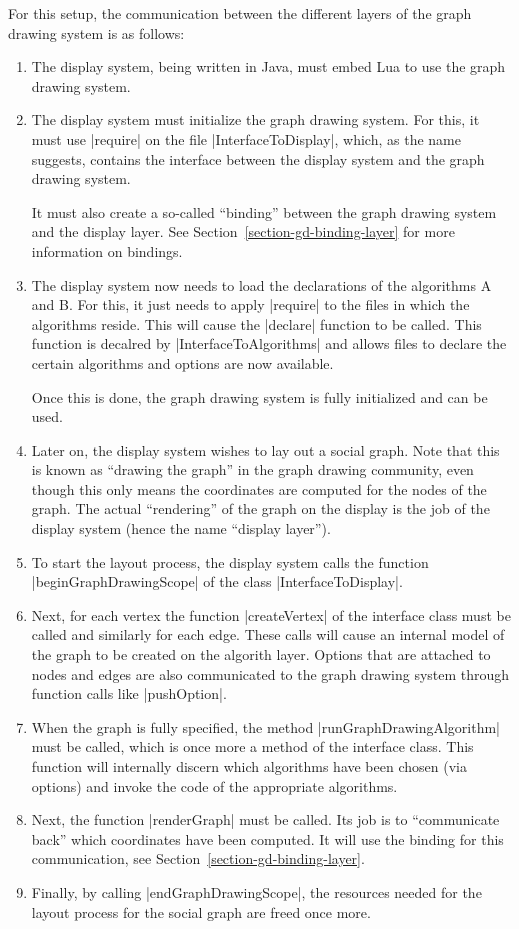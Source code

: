 For this setup, the communication between the different layers of the
graph drawing system is as follows:

\begin{enumerate}
\item The display system, being written in Java, must embed Lua to use the
  graph drawing system.
\item The display system must initialize the graph drawing system. For this,
  it must use |require| on the file |InterfaceToDisplay|, which, as
  the name suggests, contains the interface between the display
  system and the graph drawing system.
  
  It must also create a so-called ``binding'' between the
  graph drawing system and the display layer. See
  Section~\ref{section-gd-binding-layer} for more information on
  bindings.
\item The display system now needs to load the declarations of the
  algorithms A and B. For this, it just needs to apply |require| to
  the files in which the algorithms reside. This will cause the
  |declare| function to be called. This function is decalred by
  |InterfaceToAlgorithms| and allows files to declare the certain
  algorithms and options are now available.

  Once this is done, the graph drawing system is fully initialized and
  can be used.
\item Later on, the display system wishes to lay out a social graph. Note
  that this is known as ``drawing the graph'' in the graph drawing
  community, even though this only means the coordinates are computed
  for the nodes of the graph. The actual ``rendering'' of the graph on
  the display is the job of the display system (hence the name ``display
  layer'').
\item To start the layout process, the display system calls the function
  |beginGraphDrawingScope| of the class |InterfaceToDisplay|.
\item Next, for each vertex the function |createVertex| of the
  interface class must be called and similarly for each edge. These
  calls will cause an internal model of the graph to be created on the
  algorith layer. Options that are attached to nodes and edges are
  also communicated to the graph drawing system through function calls
  like |pushOption|.
\item When the graph is fully specified, the method
  |runGraphDrawingAlgorithm| must be called, which is once more a
  method of the interface class. This function will internally discern
  which algorithms have been chosen (via options) and invoke the code
  of the appropriate algorithms.
\item Next, the function |renderGraph| must be called. Its job is to
  ``communicate back'' which coordinates have been computed. It will
  use the binding for this communication, see
  Section~\ref{section-gd-binding-layer}.
\item Finally, by calling |endGraphDrawingScope|, the resources needed
  for the layout process for the social graph are freed once more.
\end{enumerate}

